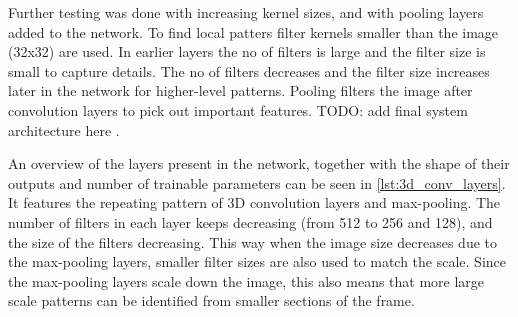 Further testing was done with increasing kernel sizes, and with pooling layers added to the network. To find local patters filter kernels smaller than the image (32x32) are used. In earlier layers the no of filters is
large and the filter size is small to capture details. The no
of filters decreases and the filter size increases later in the
network for higher-level patterns. Pooling filters the image
after convolution layers to pick out important features. \color{red} TODO: add final system architecture here \color {black}.

An overview of the layers present in the network, together with the shape of their outputs and number of trainable parameters can be seen in \cref{lst:3d_conv_layers}. It features the repeating pattern of 3D convolution layers and max-pooling. The number of filters in each layer keeps decreasing (from 512 to 256 and 128), and the size of the filters decreasing. This way when the image size decreases due to the max-pooling layers, smaller filter sizes are also used to match the scale. Since the max-pooling layers scale down the image, this also means that more large scale patterns can be identified from smaller sections of the frame.

